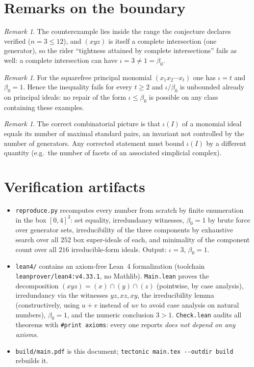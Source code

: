 \documentclass[11pt]{article}
\theoremstyle{definition}
\theoremstyle{remark}
\newtheorem{remark}[theorem]{Remark}
\begin{document}
\section{Remarks on the boundary}

\begin{remark}
The counterexample lies inside the range the conjecture declares verified
($n=3\le12$), and $(xyz)$ is itself a complete intersection (one generator),
so the rider ``tightness attained by complete intersections'' fails as well:
a complete intersection can have $\iota=3\neq1=\beta_0$.
\end{remark}

\begin{remark}
For the squarefree principal monomial $(x_1x_2\cdots x_t)$ one has
$\iota=t$ and $\beta_0=1$. Hence the inequality fails for every $t\ge2$ and
$\iota/\beta_0$ is unbounded already on principal ideals: no repair of the
form $\iota\le\beta_0$ is possible on any class containing these examples.
\end{remark}

\begin{remark}
The correct combinatorial picture is that $\iota(I)$ of a monomial ideal
equals its number of maximal standard pairs, an invariant not controlled by
the number of generators. Any corrected statement must bound $\iota(I)$ by a
different quantity (e.g.\ the number of facets of an associated simplicial
complex).
\end{remark}

\section{Verification artifacts}

\begin{itemize}
\item \texttt{reproduce.py} recomputes every number from scratch by finite
enumeration in the box $[0,4]^3$: set equality, irredundancy witnesses,
$\beta_0=1$ by brute force over generator sets, irreducibility of the three
components by exhaustive search over all $252$ box super-ideals of each, and
minimality of the component count over all $216$ irreducible-form ideals.
Output: $\iota=3$, $\beta_0=1$.
\item \texttt{lean4/} contains an axiom-free Lean~4 formalization (toolchain
\texttt{leanprover/lean4:v4.33.1}, no Mathlib). \texttt{Main.lean} proves the
decomposition $(xyz)=(x)\cap(y)\cap(z)$ (pointwise, by case analysis),
irredundancy via the witnesses $yz,xz,xy$, the irreducibility lemma
(constructively, using $u+v$ instead of $uv$ to avoid case analysis on natural
numbers), $\beta_0=1$, and the numeric conclusion $3>1$.
\texttt{Check.lean} audits all theorems with \texttt{\#print axioms}: every
one reports \emph{does not depend on any axioms}.
\item \texttt{build/main.pdf} is this document;
\texttt{tectonic main.tex -{}-outdir build} rebuilds it.
\end{itemize}
\end{document}
